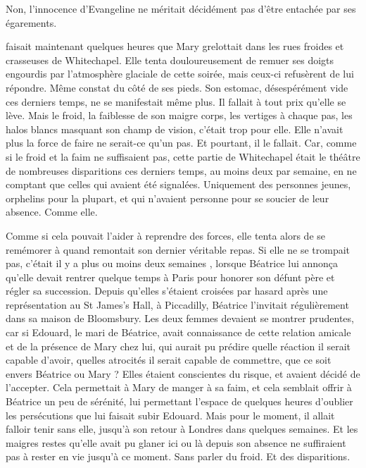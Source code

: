 Non, l'innocence d'Evangeline ne méritait décidément pas d'être entachée par ses égarements.

\fin




 faisait maintenant quelques heures que Mary grelottait dans les rues froides et crasseuses de Whitechapel.
Elle tenta douloureusement de remuer ses doigts engourdis par l'atmosphère glaciale de cette soirée, mais ceux-ci refusèrent de lui répondre.
Même constat du côté de ses pieds.
Son estomac, désespérément vide ces derniers temps, ne se manifestait même plus.
Il fallait à tout prix qu'elle se lève.
Mais le froid, la faiblesse de son maigre corps, les vertiges à chaque pas, les halos blancs masquant son champ de vision, c'était trop pour elle.
Elle n'avait plus la force de faire ne serait-ce qu'un pas.
Et pourtant, il le fallait.
Car, comme si le froid et la faim ne suffisaient pas, cette partie de Whitechapel était le théâtre de nombreuses disparitions ces derniers temps, au moins deux par semaine, en ne comptant que celles qui avaient été signalées.
Uniquement des personnes jeunes, orphelins pour la plupart, et qui n'avaient personne pour se soucier de leur absence.
Comme elle.

Comme  si cela pouvait l'aider à reprendre des forces, elle tenta alors de se remémorer à quand remontait son dernier véritable repas.
Si elle ne se trompait pas, c'était il y a plus ou moins deux semaines , lorsque Béatrice lui annonça qu'elle devait rentrer quelque temps à Paris pour honorer son défunt père et régler sa succession.
Depuis qu'elles s'étaient croisées par hasard après une représentation au St James’s Hall, à Piccadilly, Béatrice l'invitait régulièrement dans sa maison de Bloomsbury.
Les deux femmes devaient se montrer prudentes, car si Edouard, le mari de Béatrice, avait connaissance de cette relation amicale et de la présence de Mary chez lui, qui aurait pu prédire quelle réaction il serait capable d'avoir, quelles atrocités il serait capable de commettre, que ce soit envers Béatrice ou Mary ?
Elles étaient conscientes du risque, et avaient décidé de l'accepter.
Cela permettait à Mary de manger à sa faim, et cela semblait offrir à Béatrice un peu de sérénité, lui permettant l'espace de quelques heures d'oublier les persécutions que lui faisait subir Edouard.
Mais pour le moment, il allait falloir tenir sans elle, jusqu'à son retour à Londres dans quelques semaines.
Et les maigres restes qu'elle avait pu glaner ici ou là depuis son absence ne suffiraient pas à rester en vie jusqu'à ce moment.
Sans parler du froid.
Et des disparitions.

